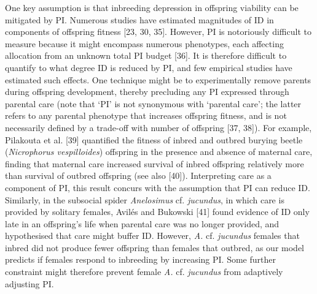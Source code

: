 \documentclass[12pt]{article}
\begin{document}
One key assumption is that inbreeding depression in offspring viability can be mitigated by PI. Numerous studies have estimated magnitudes of ID in components of offspring fitness [23, 30, 35]. However, PI is notoriously difficult to measure because it might encompass numerous phenotypes, each affecting allocation from an unknown total PI budget [36]. It is therefore difficult to quantify to what degree ID is reduced by PI, and few empirical studies have estimated such effects. One technique might be to experimentally remove parents during offspring development, thereby precluding any PI expressed through parental care (note that `PI' is not synonymous with `parental care'; the latter refers to any parental phenotype that increases offspring fitness, and is not necessarily defined by a trade-off with number of offspring [37, 38]). For example, Pilakouta et al. [39] quantified the fitness of inbred and outbred burying beetle (\textit{Nicrophorus vespilloides}) offspring in the presence and absence of maternal care, finding that maternal care increased survival of inbred offspring relatively more than survival of outbred offspring (see also [40]). Interpreting care as a component of PI, this result concurs with the assumption that PI can reduce ID. Similarly, in the subsocial spider \textit{Anelosimus} cf. \textit{jucundus}, in which care is provided by solitary females, Avil{\'{e}}s and Bukowski [41] found evidence of ID only late in an offspring's life when parental care was no longer provided, and hypothesised that care might buffer ID. However, \textit{A.} cf. \textit{jucundus} females that inbred did not produce fewer offspring than females that outbred, as our model predicts if females respond to inbreeding by increasing PI. Some further constraint might therefore prevent female \textit{A.} cf. \textit{jucundus} from adaptively adjusting PI.
\end{document}
